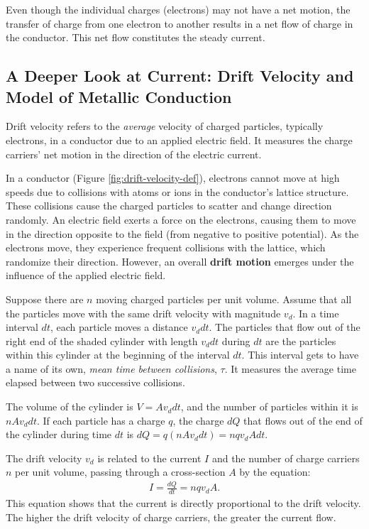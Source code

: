 \documentclass[12pt,b4paper]{article}
\begin{document}
Even though the individual charges (electrons) may not have a net motion, the transfer of charge from one electron to another results in a net flow of charge in the conductor. This net flow constitutes the steady current.
\subsection{A Deeper Look at Current: Drift Velocity and Model of Metallic Conduction}
Drift velocity refers to the \textit{average} velocity of charged particles, typically electrons, in a conductor due to an applied electric field. It measures the charge carriers' net motion in the direction of the electric current.

In a conductor (Figure \ref{fig:drift-velocity-def}), electrons cannot move at high speeds due to collisions with atoms or ions in the conductor's lattice structure. These collisions cause the charged particles to scatter and change direction randomly. An electric field exerts a force on the electrons, causing them to move in the direction opposite to the field (from negative to positive potential). As the electrons move, they experience frequent collisions with the lattice, which randomize their direction. However, an overall \textbf{drift motion} emerges under the influence of the applied electric field.

Suppose there are $n$ moving charged particles per unit volume. Assume that all the particles move with the same drift velocity with magnitude $v_d$. In a time interval $dt$, each particle moves a distance $v_d dt$. The particles that flow out of the right end of the shaded cylinder with length $v_d dt$ during $dt$ are the particles within this cylinder at the beginning of the interval $dt$. This interval gets to have a name of its own, \textit{mean time between collisions}, $\tau$. It measures the average time elapsed between two successive collisions.

The volume of the cylinder is $V=Av_d dt$, and the number of particles within it is $n Av_d dt$. If each particle has a charge $q$, the charge $dQ$ that flows out of the end of the cylinder during time $dt$ is $dQ=q(nAv_ddt)=nqv_dAdt$.

The drift velocity $v_d$ is related to the current $I$ and the number of charge carriers $n$ per unit volume, passing through a cross-section $A$ by the equation:
\begin{align}
    I=\frac{dQ}{dt}=nqv_dA.\label{current-with-drift-speed}
\end{align}
This equation shows that the current is directly proportional to the drift velocity. The higher the drift velocity of charge carriers, the greater the current flow. 
\end{document}
